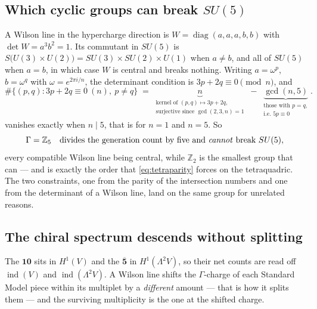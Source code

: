 \documentclass[11pt,a4paper]{article}
\theoremstyle{definition}
\begin{document}
\subsection{Which cyclic groups can break $SU(5)$}

A Wilson line in the hypercharge direction is
$W = \operatorname{diag}(a,a,a,b,b)$ with $\det W = a^3 b^2 = 1$. Its
commutant in $SU(5)$ is $S\bigl(U(3)\times U(2)\bigr) = SU(3)\times SU(2)\times
U(1)$ when $a \neq b$, and all of $SU(5)$ when $a = b$, in which case $W$ is
central and breaks nothing. Writing $a = \omega^p$, $b = \omega^q$ with
$\omega = e^{2\pi i/n}$, the determinant condition is $3p + 2q \equiv 0
\pmod n$, and
%
\begin{equation}
\#\bigl\{(p,q) : 3p + 2q \equiv 0 \ (n),\ p \neq q\bigr\}
\;=\;
\underbrace{n}_{\substack{\text{kernel of }(p,q)\mapsto 3p+2q,\\ \text{surjective since }\gcd(2,3,n)=1}}
\;-\;
\underbrace{\gcd(n,5)}_{\substack{\text{those with } p=q,\\ \text{i.e. } 5p \equiv 0}} .
\label{eq:wilsoncount}
\end{equation}
%
 vanishes exactly when $n \mid 5$, that is for $n = 1$ and
$n = 5$. So
%
\begin{equation}
\Gamma = \mathbb{Z}_5
\quad\text{divides the generation count by five and \emph{cannot} break }SU(5),
\end{equation}
%
every compatible Wilson line being central, while $\mathbb{Z}_2$ is the
smallest group that can --- and is exactly the order that
\cref{eq:tetraparity} forces on the tetraquadric. The two constraints, one from
the parity of the intersection numbers and one from the determinant of a
Wilson line, land on the same group for unrelated reasons.

\subsection{The chiral spectrum descends without splitting}

The $\mathbf{10}$ sits in $H^1(V)$ and the $\overline{\mathbf{5}}$ in
$H^1(\Lambda^2 V)$, so their net counts are read off
$\operatorname{ind}(V)$ and $\operatorname{ind}(\Lambda^2 V)$. A Wilson line
shifts the $\Gamma$-charge of each Standard Model piece within its multiplet by
a \emph{different} amount --- that is how it splits them --- and the surviving
multiplicity is the one at the shifted charge.
\end{document}

